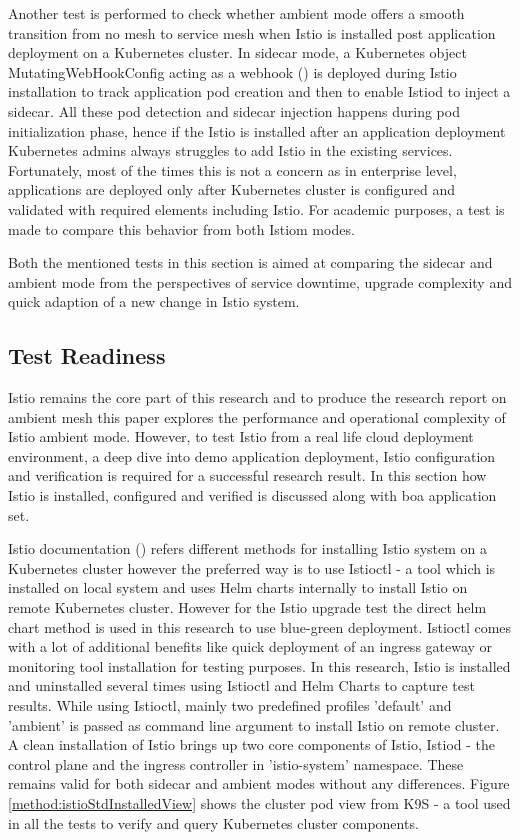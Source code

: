 Another test is performed to check whether ambient mode offers a smooth transition from no mesh to service mesh when Istio is installed post application deployment on a Kubernetes cluster. In sidecar mode, a Kubernetes object MutatingWebHookConfig acting as a webhook (\cite{krochmalski2017docker}) is deployed during Istio installation to track application pod creation and then to enable Istiod to inject a sidecar. All these pod detection and sidecar injection happens during pod initialization phase, hence if the Istio is installed after an application deployment Kubernetes admins always struggles to add Istio in the existing services. Fortunately, most of the times this is not a concern as in enterprise level, applications are deployed only after Kubernetes cluster is configured and validated with required elements including Istio. For academic purposes, a test is made to compare this behavior from both Istiom modes.

Both the mentioned tests in this section is aimed at comparing the sidecar and ambient mode from the perspectives of service downtime, upgrade complexity and quick adaption of a new change in Istio system.

\subsection{Test Readiness}
\label{testReadiness}
Istio remains the core part of this research and to produce the research report on ambient mesh this paper explores the performance and operational complexity of Istio ambient mode. However, to test Istio from a real life cloud deployment environment, a deep dive into demo application deployment, Istio configuration and verification is required for a successful research result. In this section how Istio is installed, configured and verified is discussed along with \acrshort{boa} application set.

Istio documentation (\cite{istioDocInstall}) refers different methods for installing Istio system on a Kubernetes cluster however the preferred way is to use Istioctl - a tool which is installed on local system and uses Helm charts internally to install Istio on remote Kubernetes cluster. However for the Istio upgrade test the direct helm chart method is used in this research to use blue-green deployment. Istioctl comes with a lot of additional benefits like quick deployment of an ingress gateway or monitoring tool installation for testing purposes. In this research, Istio is installed and uninstalled several times using Istioctl and Helm Charts to capture test results. While using Istioctl, mainly two predefined profiles 'default' and 'ambient' is passed as command line argument to install Istio on remote cluster. A clean installation of Istio brings up two core components of Istio, Istiod - the control plane and the ingress controller in 'istio-system' namespace. These remains valid for both sidecar and ambient modes without any differences. Figure \ref{method:istioStdInstalledView} shows the cluster pod view from K9S - a tool used in all the tests to verify and query Kubernetes cluster components.

